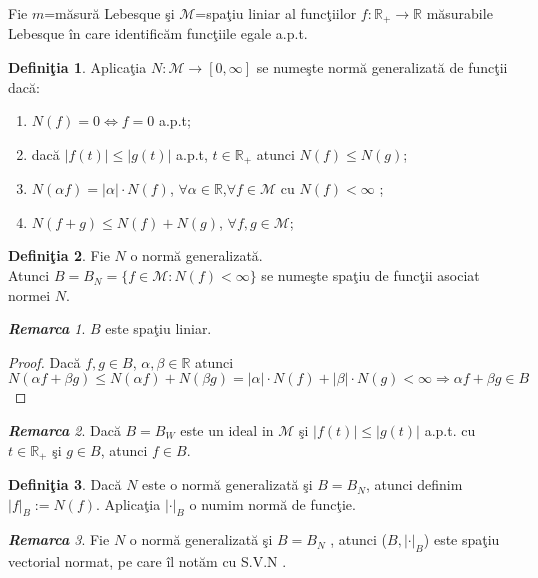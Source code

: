 \documentclass[ a4paper, 12pt]{report}
\theoremstyle{definition}
\newtheorem{definition}{\bf Defini\c tia}[section]
\theoremstyle{remark}
\newtheorem{remarc}{\bf Remarca}[section]
\numberwithin{equation}{section}
\begin{document}
Fie $m$=m\u asur\u a Lebesque \c si $\mathcal{M}$=spa\c tiu liniar al func\c tiilor $f:\mathbb{R}_+\rightarrow \mathbb{R}$     m\u asurabile Lebesque \^in care identific\u am func\c tiile egale a.p.t.\\
\begin{definition}
Aplica\c tia $N:\mathcal{M}\rightarrow[0,\infty]$ se nume\c ste norm\u a generalizat\u a de func\c tii dac\u a:
\begin{enumerate}
\item $N(f)=0\Leftrightarrow f=0$ a.p.t;
\item dac\u a $ \lvert f(t) \rvert\leqslant \lvert g(t) \rvert$ a.p.t, $t\in \mathbb{R}_+$ atunci $N(f)\leqslant N(g)$;
\item $N(\alpha f)=\lvert \alpha \rvert \cdot N(f)$, $\forall \alpha\in \mathbb{R}$,$\forall  f\in \mathcal{M}$ cu $N(f)<\infty$ ;
\item $N(f+g)\leqslant N(f)+N(g) $, $\forall f,g\in \mathcal{M}$;
\end{enumerate}
\end{definition}
\begin{definition}
Fie $N$ o norm\u a generalizat\u a.\\Atunci $B=B_N=\{f \in \mathcal{M}:N(f)<\infty\}$ se nume\c ste spa\c tiu de func\c tii asociat normei $N$.
\end{definition}
\begin{remarc}
$B$  este spa\c tiu liniar.
\begin{proof}
Dac\u a $f,g\in B$, $\alpha,\beta \in \mathbb{R}$ atunci $N(\alpha f + \beta g)\leqslant N(\alpha f)+N(\beta g)=\lvert \alpha \rvert \cdot N(f)+\lvert \beta \rvert \cdot N(g)<\infty \Rightarrow \alpha f + \beta g \in B$
\end{proof}
\end{remarc}
\begin{remarc}
 Dac\u a $B=B_W$ este un ideal in $\mathcal{M}$  \c si $\lvert f(t) \rvert \leqslant \lvert g(t) \rvert$ a.p.t. cu $t \in \mathbb{R}_+$ \c si $g \in B$, atunci $f \in B$.
\end{remarc}
\begin{definition}
Dac\u a $N$ este o norm\u a generalizat\u a \c si $B=B_N$, atunci  definim $\lvert  f \rvert_B := N(f)$. Aplica\c tia $\lvert  \cdot  \rvert _B$ o numim norm\u a de func\c tie.
\end{definition}
\begin{remarc}
Fie $N$ o norm\u a generalizat\u a \c si $B=B_N$ , atunci ($B,\lvert \cdot \rvert_B$) este spa\c tiu vectorial normat, pe care \^il not\u am cu S.V.N .
\end{remarc}
\end{document}
